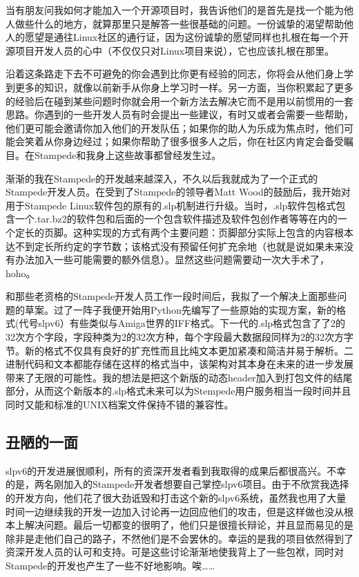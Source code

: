 当有朋友问我如何才能加入一个开源项目时，我告诉他们的是首先是找一个能为他人做些什么的地方，就算那里只是解答一些很基础的问题。一份诚挚的渴望帮助他人的愿望是通往Linux社区的通行证，因为这份诚挚的愿望同样也扎根在每一个开源项目开发人员的心中（不仅仅只对Linux项目来说），它也应该扎根在那里。

沿着这条路走下去不可避免的你会遇到比你更有经验的同志，你将会从他们身上学到更多的知识，就像以前新手从你身上学习时一样。另一方面，当你积累起了更多的经验后在碰到某些问题时你就会用一个新方法去解决它而不是用以前惯用的一套思路。你遇到的一些开发人员有时会提出一些建议，有时又或者会需要一些帮助，他们更可能会邀请你加入他们的开发队伍；如果你的助人为乐成为焦点时，他们可能会笑着从你身边经过；如果你帮助了很多很多人之后，你在社区内肯定会备受瞩目。在Stampede和我身上这些故事都曾经发生过。

渐渐的我在Stampede的开发越来越深入，不久以后我就成为了一个正式的Stampede开发人员。在受到了Stampede的领导者Matt Wood的鼓励后，我开始对用于Stampede Linux软件包的原有的.slp机制进行升级。当时，.slp软件包格式包含一个.tar.bz2的软件包和后面的一个包含软件描述及软件包创作者等等在内的一个定长的页脚。这种实现的方式有两个主要问题：页脚部分实际上包含的内容根本达不到定长所约定的字节数；该格式没有预留任何扩充余地（也就是说如果未来没有办法加入一些可能需要的额外信息）。显然这些问题需要动一次大手术了，hoho。

和那些老资格的Stampede开发人员工作一段时间后，我拟了一个解决上面那些问题的草案。过了一阵子我便开始用Python先编写了一些原始的实现方案，新的格式(代号slpv6）有些类似与Amiga世界的IFF格式。下一代的.slp格式包含了了2的32次方个字段，字段种类为2的32次方种，每个字段最大数据段同样为2的32次方字节。新的格式不仅具有良好的扩充性而且比纯文本更加紧凑和简洁并易于解析。二进制代码和文本都能存储在这样的格式当中，该架构对其本身在未来的进一步发展带来了无限的可能性。我的想法是把这个新版的动态header加入到打包文件的结尾部分，从而这个新版本的.slp格式未来可以为Stempede用户服务相当一段时间并且同时又能和标准的UNIX档案文件保持不错的兼容性。

\subsection{丑陋的一面}

slpv6的开发进展很顺利，所有的资深开发者看到我取得的成果后都很高兴。不幸的是，两名刚加入的Stampede开发者想要自己掌控slpv6项目。由于不欣赏我选择的开发方向，他们花了很大劲诋毁和打击这个新的slpv6系统，虽然我也用了大量时间一边继续我的开发一边加入讨论再一边回应他们的攻击，但是这样做也没从根本上解决问题。最后一切都变的很明了，他们只是很擅长辩论，并且显而易见的是除非是走他们自己的路子，不然他们是不会罢休的。幸运的是我的项目依然得到了资深开发人员的认可和支持。可是这些讨论渐渐地使我背上了一些包袱，同时对Stampede的开发也产生了一些不好地影响。唉……

